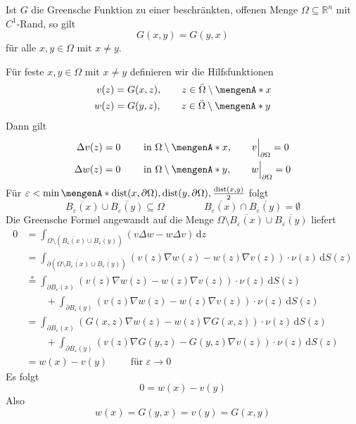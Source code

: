 \begin{satz}
	Ist $G$ die Greensche Funktion zu einer beschränkten, offenen Menge $\Omega \subseteq \mathbb{R}^n$ mit $C^1$-Rand, so gilt 
	\[
	G(x,y)=G(y,x)  	
	\]  
	für alle $x,y \in \Omega$ mit  $x \neq y$.
\end{satz}
\begin{beweis}
	Für feste $x,y \in \Omega$ mit $x \neq y$ definieren wir die Hilfsfunktionen 
	\begin{align*}
		v(z) &= G(x,z), \qquad z \in \bar{\Omega} \setminus \set{x} \\
		w(z) &= G(y,z), \qquad z \in \bar{\Omega} \setminus \set{y}
	\end{align*}
	Dann gilt
	\begin{align*}
		\Delta v(z) &= 0 \qquad \text{ in } \Omega \setminus \set{x}, \qquad v  \Big|_{\partial \Omega}^{}= 0 \\
		\Delta w(z) &= 0 \qquad \text{ in } \Omega \setminus \set{y}, \qquad w  \Big|_{\partial \Omega}^{}= 0 
	\end{align*}
	Für $\varepsilon < \min \set{ \dist(x, \partial \Omega) , \dist(y, \partial \Omega), \frac{\dist(x,y)}{2} }$ folgt
	\[
		\overline{B_\varepsilon(x)} \cup \overline{B_\varepsilon(y)} \subseteq \Omega \qquad
		 \qquad \overline{B_\varepsilon(x)} \cap \overline{B_\varepsilon(y)} = \emptyset 
	\]
	Die Greensche Formel angewandt auf die Menge $\Omega \setminus \overline{B_\varepsilon(x)} \cup \overline{B_\varepsilon(y)}$ liefert
	\begin{align*}
		0 &= \int_{\Omega \setminus (\overline{B_\varepsilon(x)} \cup \overline{B_\varepsilon(y)})}^{} (v \Delta w - w \Delta v) \,\mathrm{d}z  \\
		&= \int_{\partial ( \Omega \setminus \overline{B_\varepsilon(x)} \cup \overline{B_\varepsilon(y)})}^{} (v(z)  \nabla w(z)- w(z)  \nabla v(z))\cdot \nu(z)
		 \,\mathrm{d}S(z)\\ 
		& \stackrel{*}{=} \int_{\partial B_\varepsilon(x) }^{} (v(z)  \nabla w(z)- w(z)  \nabla v(z))\cdot \nu(z)
		 \,\mathrm{d}S(z) \\
		& \qquad + \int_{\partial B_\varepsilon(y) }^{} (v(z)  \nabla w(z)- w(z)  \nabla v(z))\cdot \nu(z)
		 \,\mathrm{d}S(z) \\
		&= \int_{\partial B_\varepsilon(x) }^{} (G(x,z)  \nabla w(z)- w(z)  \nabla G(x,z))\cdot \nu(z)
		 \,\mathrm{d}S(z) \\
		& \qquad + \int_{\partial B_\varepsilon(y) }^{} (v(z)  \nabla G(y,z)- G(y,z)  \nabla v(z))\cdot \nu(z)
		 \,\mathrm{d}S(z) \\
		 &= w(x)- v(y) \qquad \text{ für } \varepsilon \to  0
		\end{align*}
		Es folgt
		\[
			0 = w(x)- v(y)
		\]
		Also \[
			w(x)= G(y,x) = v(y) = G(x,y)
		\]
\end{beweis}